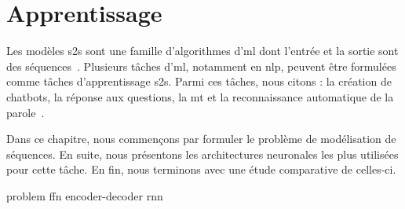 \chapter{Apprentissage }

Les modèles \gls{s2s} sont une famille d'algorithmes d'\gls{ml}
dont l'entrée et la sortie sont des séquences~\cite{Martins_2018}.
Plusieurs tâches d'\gls{ml}, notamment en \gls{nlp}, 
peuvent être formulées comme tâches d'apprentissage \gls{s2s}.
Parmi ces tâches, nous citons : la création de chatbots, la réponse aux questions, 
la \gls{mt} et la reconnaissance automatique de la parole~\cite{Fathi_2021}.

Dans ce chapitre, nous commençons par formuler le problème de modélisation de séquences.
En suite, nous présentons les architectures neuronales les plus utilisées pour cette tâche.
En fin, nous terminons avec une étude comparative de celles-ci.

{problem}
{ffn}
{encoder-decoder}
{rnn}

